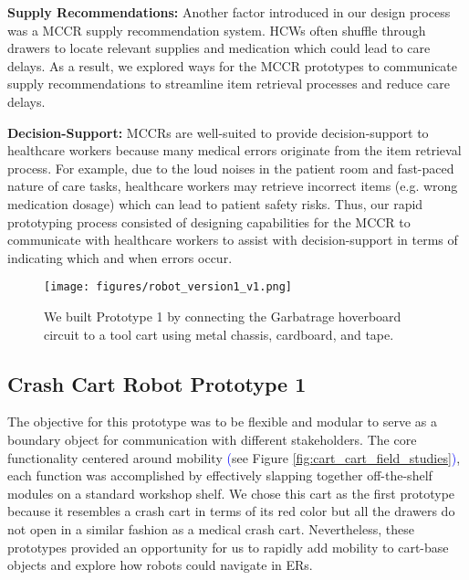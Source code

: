 \textbf{Supply Recommendations:} Another factor introduced in our design process was a MCCR supply recommendation system. 
HCWs often shuffle through drawers to locate relevant supplies and medication which could lead to care delays. 
As a result, we explored ways for the MCCR prototypes to communicate supply recommendations to streamline item retrieval processes and reduce care delays.

\textbf{Decision-Support:} MCCRs are well-suited to provide decision-support to healthcare workers because many medical errors originate from the item retrieval process. 
For example, due to the loud noises in the patient room and fast-paced nature of care tasks, healthcare workers may retrieve incorrect items (e.g. wrong medication dosage) which can lead to patient safety risks. 
Thus, our rapid prototyping process consisted of designing capabilities for the MCCR to communicate with healthcare workers to assist with decision-support in terms of indicating which and when errors occur. 


 \begin{figure}[t] 
	\centering 
	\texttt{[image: figures/robot\_version1\_v1.png]} 
	\caption{We built Prototype 1 by connecting the Garbatrage hoverboard circuit \cite{mandel2023recapturing} to a tool cart using metal chassis, cardboard, and tape.} 
	\label{fig:robot_version1} 
\end{figure}

\subsection{Crash Cart Robot Prototype 1}

The objective for this prototype was to be flexible and modular to serve as a boundary object for communication with different stakeholders. 
The core functionality centered around mobility \textcolor{blue}{(}see Figure \ref{fig:cart_cart_field_studies}\textcolor{blue}{)}, each function was accomplished by effectively slapping together off-the-shelf modules on a standard workshop shelf.
We chose this cart as the first prototype because it resembles a crash cart in terms of its red color but all the drawers do not open in a similar fashion as a medical crash cart.
Nevertheless, these prototypes provided an opportunity for us to rapidly add mobility to cart-base objects and explore how robots could navigate in ERs.

